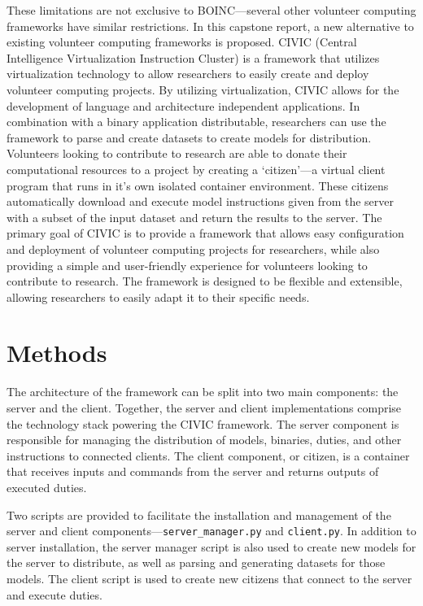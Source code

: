 \documentclass[11pt]{article}
\begin{document}
These limitations are not exclusive to BOINC---several other volunteer computing frameworks have similar restrictions. In this capstone report, a new alternative to existing volunteer computing frameworks is proposed. CIVIC (Central Intelligence Virtualization Instruction Cluster) is a framework that utilizes virtualization technology to allow researchers to easily create and deploy volunteer computing projects. By utilizing virtualization, CIVIC allows for the development of language and architecture independent applications. In combination with a binary application distributable, researchers can use the framework to parse and create datasets to create models for distribution. Volunteers looking to contribute to research are able to donate their computational resources to a project by creating a `citizen'---a virtual client program that runs in it's own isolated container environment. These citizens automatically download and execute model instructions given from the server with a subset of the input dataset and return the results to the server. The primary goal of CIVIC is to provide a framework that allows easy configuration and deployment of volunteer computing projects for researchers, while also providing a simple and user-friendly experience for volunteers looking to contribute to research. The framework is designed to be flexible and extensible, allowing researchers to easily adapt it to their specific needs.

\section{Methods}

The architecture of the framework can be split into two main components: the server and the client. Together, the server and client implementations comprise the technology stack powering the CIVIC framework. The server component is responsible for managing the distribution of models, binaries, duties, and other instructions to connected clients. The client component, or citizen, is a container that receives inputs and commands from the server and returns outputs of executed duties.

Two scripts are provided to facilitate the installation and management of the server and client components---\verb|server_manager.py| and \verb|client.py|. In addition to server installation, the server manager script is also used to create new models for the server to distribute, as well as parsing and generating datasets for those models. The client script is used to create new citizens that connect to the server and execute duties.
\end{document}
